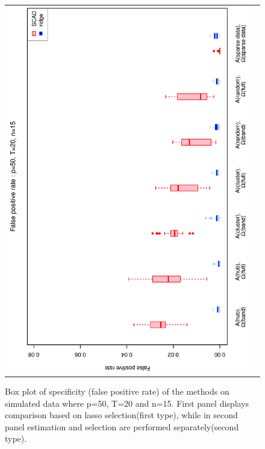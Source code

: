 \documentclass[a4paper]{article}
\begin{document}
\begin{figure}[h!]
\begin{tabular}{cc}
\includegraphics[scale=0.5,angle=270]{ROCfpr50T20N15b.eps}\\
\end{tabular}
\caption{Box plot of specificity (false positive rate) of the methods on simulated data where p=50, T=20 and n=15. First panel displays comparison based on lasso selection(first type), while in second panel estimation and selection are performed separately(second type).}
\label{fig:fpr50T20N15}
\end{figure}
\end{document}
